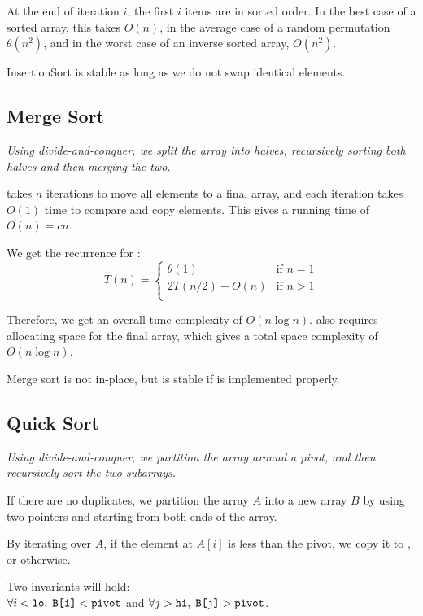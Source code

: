 At the end of iteration $i$, the first $i$ items are in sorted order.
In the best case of a sorted array, this takes $O(n)$, in the average case of a random permutation $\theta(n^2)$,
and in the worst case of an inverse sorted array, $O(n^2)$.

InsertionSort is stable as long as we do not swap identical elements.

\subsection{Merge Sort}
\emph{Using divide-and-conquer, we split the array into halves, recursively sorting both halves and then merging the two.}

 takes $n$ iterations to move all elements to a final array, and each iteration takes $O(1)$ time to compare and copy elements.
This gives a running time of $O(n) = cn$.

We get the recurrence for : \\[0.2em]
\[ T(n) = \begin{cases} 
    \theta(1) & \text{if } n = 1 \\
    2T(n/2) + O(n) & \text{if $n > 1$} \\
 \end{cases}
\]

Therefore, we get an overall time complexity of $O(n \log n)$.
 also requires allocating space for the final array, which gives a total space complexity of $O(n \log n)$.

Merge sort is not in-place, but is stable if  is implemented properly.

\subsection{Quick Sort}
\emph{Using divide-and-conquer, we partition the array around a pivot, and then recursively sort the two subarrays.}

If there are no duplicates, we partition the array $A$ into a new array $B$ by using two pointers  and 
starting from both ends of the array.

By iterating over $A$, if the element at $A[i]$ is less than the pivot, we copy it to , or  otherwise.

Two invariants will hold:\\
$\forall i < \texttt{lo}, \; \texttt{B[i]} < \texttt{pivot}$ and $\forall j > \texttt{hi}, \; \texttt{B[j]} > \texttt{pivot}$.

